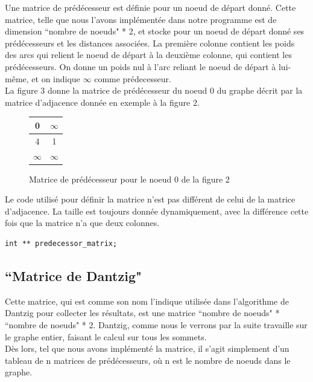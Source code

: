 \documentclass[a4paper,12pt,final] {article}
\begin{document}
Une matrice de prédécesseur est définie pour un noeud de départ donné. Cette matrice, telle que nous l'avons implémentée dans notre programme est de dimension ``nombre de noeuds" * 2, et stocke pour un noeud de départ donné ses prédécesseurs et les distances associées. La première colonne contient les poids des arcs qui relient le noeud de départ à la deuxième colonne, qui contient les prédécesseurs. On donne un poids nul à l'arc reliant le noeud de départ  à lui-même, et on indique $\infty$ comme prédecesseur.\\

La figure 3 donne la matrice de prédécesseur du noeud 0 du graphe décrit par la matrice d'adjacence donnée en exemple à la figure 2.\\ %

\begin{figure}[htdp]
\begin{center}
\begin{tabular}{|c|c|}
\hline
0 &$\infty$\\
\hline
4 & 1 \\
\hline
$\infty$ & $\infty$ \\
\hline
\end{tabular}
\end{center}
\caption{Matrice de prédécesseur pour le noeud 0 de la figure 2}
\end{figure}%

Le code utilisé pour définir la matrice n'est pas différent de celui de la matrice d'adjacence. La taille est toujours donnée dynamiquement, avec la différence cette fois que la matrice n'a que deux colonnes.
\begin{lstlisting}
int ** predecessor_matrix;
\end{lstlisting}

\subsection{``Matrice de Dantzig"}

Cette matrice, qui est comme son nom l'indique utilisée dans l'algorithme de Dantzig pour collecter les résultats, est une matrice ``nombre de noeuds" * ``nombre de noeuds" * 2. Dantzig, comme nous le verrons par la suite travaille sur le graphe entier, faisant  le calcul sur tous les sommets.\\

Dès lors, tel que nous avons implémenté la matrice, il s'agit simplement d'un tableau de n matrices de prédécesseurs, où n est le nombre de noeuds dans le graphe.\\
\end{document}
